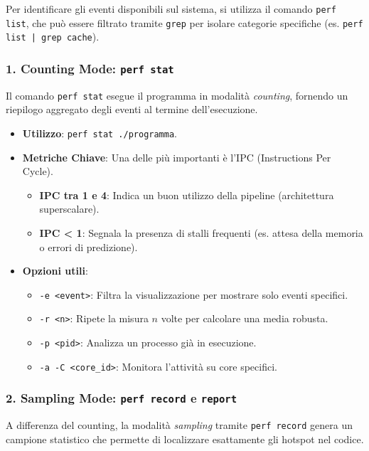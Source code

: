 Per identificare gli eventi disponibili sul sistema, si utilizza il comando \texttt{perf list}, che può essere filtrato tramite \texttt{grep} per isolare categorie specifiche (es. \texttt{perf list | grep cache}).

\subsubsection*{1. Counting Mode: \texttt{perf stat}}
Il comando \texttt{perf stat} esegue il programma in modalità \textit{counting}, fornendo un riepilogo aggregato degli eventi al termine dell'esecuzione.

\begin{itemize}
    \item \textbf{Utilizzo}: \texttt{perf stat ./programma}.
    \item \textbf{Metriche Chiave}: Una delle più importanti è l'IPC (Instructions Per Cycle).
    \begin{itemize}
        \item \textbf{IPC tra 1 e 4}: Indica un buon utilizzo della pipeline (architettura superscalare).
        \item \textbf{IPC < 1}: Segnala la presenza di stalli frequenti (es. attesa della memoria o errori di predizione).
    \end{itemize}
    \item \textbf{Opzioni utili}:
    \begin{itemize}
        \item \texttt{-e <event>}: Filtra la visualizzazione per mostrare solo eventi specifici.
        \item \texttt{-r <n>}: Ripete la misura $n$ volte per calcolare una media robusta.
        \item \texttt{-p <pid>}: Analizza un processo già in esecuzione.
        \item \texttt{-a -C <core\_id>}: Monitora l'attività su core specifici.
    \end{itemize}
\end{itemize}

\subsubsection*{2. Sampling Mode: \texttt{perf record} e \texttt{report}}
A differenza del counting, la modalità \textit{sampling} tramite \texttt{perf record} genera un campione statistico che permette di localizzare esattamente gli hotspot nel codice.

